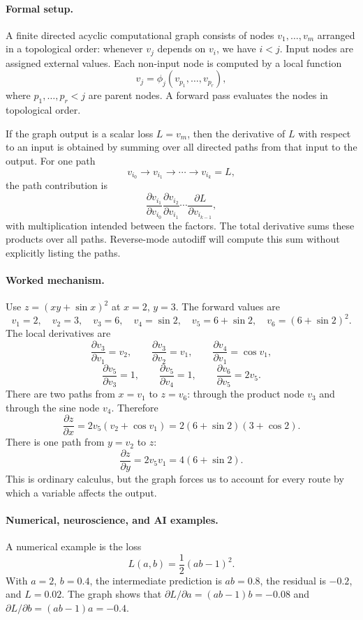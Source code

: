 \paragraph{Formal setup.}
A finite directed acyclic computational graph consists of nodes \(v_1,\ldots,v_m\) arranged in a topological order: whenever \(v_j\) depends on \(v_i\), we have \(i<j\). Input nodes are assigned external values. Each non-input node is computed by a local function
\[
v_j=\phi_j(v_{p_1},\ldots,v_{p_r}),
\]
where \(p_1,\ldots,p_r<j\) are parent nodes. A forward pass evaluates the nodes in topological order.

If the graph output is a scalar loss \(L=v_m\), then the derivative of \(L\) with respect to an input is obtained by summing over all directed paths from that input to the output. For one path
\[
v_{i_0}\to v_{i_1}\to\cdots\to v_{i_k}=L,
\]
the path contribution is
\[
\frac{\partial v_{i_1}}{\partial v_{i_0}}
\frac{\partial v_{i_2}}{\partial v_{i_1}}
\cdots
\frac{\partial L}{\partial v_{i_{k-1}}},
\]
with multiplication intended between the factors. The total derivative sums these products over all paths. Reverse-mode autodiff will compute this sum without explicitly listing the paths.

\paragraph{Worked mechanism.}
Use \(z=(xy+\sin x)^2\) at \(x=2\), \(y=3\). The forward values are
\[
v_1=2,\quad v_2=3,\quad v_3=6,\quad v_4=\sin 2,\quad
v_5=6+\sin 2,\quad v_6=(6+\sin 2)^2.
\]
The local derivatives are
\[
\frac{\partial v_3}{\partial v_1}=v_2,\qquad
\frac{\partial v_3}{\partial v_2}=v_1,\qquad
\frac{\partial v_4}{\partial v_1}=\cos v_1,
\]
\[
\frac{\partial v_5}{\partial v_3}=1,\qquad
\frac{\partial v_5}{\partial v_4}=1,\qquad
\frac{\partial v_6}{\partial v_5}=2v_5.
\]
There are two paths from \(x=v_1\) to \(z=v_6\): through the product node \(v_3\) and through the sine node \(v_4\). Therefore
\[
\frac{\partial z}{\partial x}
=2v_5\left(v_2+\cos v_1\right)
=2(6+\sin 2)(3+\cos 2).
\]
There is one path from \(y=v_2\) to \(z\):
\[
\frac{\partial z}{\partial y}
=2v_5v_1
=4(6+\sin 2).
\]
This is ordinary calculus, but the graph forces us to account for every route by which a variable affects the output.

\paragraph{Numerical, neuroscience, and AI examples.}
A numerical example is the loss
\[
L(a,b)=\frac12(a b-1)^2.
\]
With \(a=2\), \(b=0.4\), the intermediate prediction is \(ab=0.8\), the residual is \(-0.2\), and \(L=0.02\). The graph shows that \(\partial L/\partial a=(ab-1)b=-0.08\) and \(\partial L/\partial b=(ab-1)a=-0.4\).

